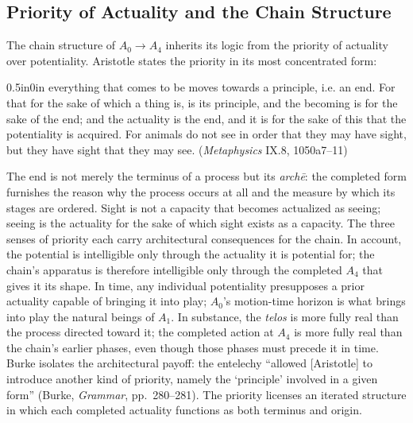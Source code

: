 \subsection{Priority of Actuality and the Chain Structure}

The chain structure of $A_0 \rightarrow A_4$ inherits its logic from the priority of actuality over potentiality. Aristotle states the priority in its most concentrated form:
\begin{adjustwidth}{0.5in}{0in}
everything that comes to be moves towards a principle, i.e. an end. For that for the sake of which a thing is, is its principle, and the becoming is for the sake of the end; and the actuality is the end, and it is for the sake of this that the potentiality is acquired. For animals do not see in order that they may have sight, but they have sight that they may see. (\textit{Metaphysics} IX.8, 1050a7--11)
\end{adjustwidth}
The end is not merely the terminus of a process but its \textit{archē}: the completed form furnishes the reason why the process occurs at all and the measure by which its stages are ordered. Sight is not a capacity that becomes actualized as seeing; seeing is the actuality for the sake of which sight exists as a capacity. The three senses of priority each carry architectural consequences for the chain. In account, the potential is intelligible only through the actuality it is potential for; the chain's apparatus is therefore intelligible only through the completed $A_4$ that gives it its shape. In time, any individual potentiality presupposes a prior actuality capable of bringing it into play; $A_0$'s motion-time horizon is what brings into play the natural beings of $A_1$. In substance, the \textit{telos} is more fully real than the process directed toward it; the completed action at $A_4$ is more fully real than the chain's earlier phases, even though those phases must precede it in time. Burke isolates the architectural payoff: the entelechy ``allowed [Aristotle] to introduce another kind of priority, namely the `principle' involved in a given form'' (Burke, \textit{Grammar}, pp.~280--281). The priority licenses an iterated structure in which each completed actuality functions as both terminus and origin.

